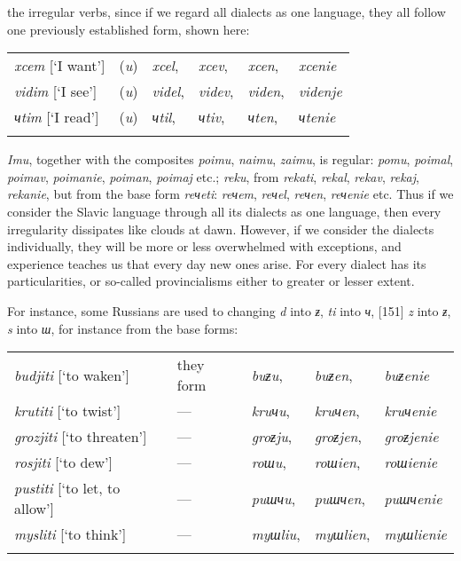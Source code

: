 the irregular verbs, since if we regard all dialects as one language, they all follow one previously established form, shown here:

\begin{longtable}{ l l l l l l }
    \lsptoprule
    \textit{xcem} [‘I want’] & (\textit{u}) & \textit{xcel}, & \textit{xcev}, & \textit{xcen}, & \textit{xcenie} \\
    \textit{vidim} [‘I see’] & (\textit{u}) & \textit{videl}, & \textit{videv}, & \textit{viden}, & \textit{videnje} \\
    \textit{чtim} [‘I read’] & (\textit{u}) & \textit{чtil}, & \textit{чtiv}, & \textit{чten}, & \textit{чtenie} \\
    \lspbottomrule
\end{longtable}

\textit{Imu}, together with the composites \textit{poimu}, \textit{naimu}, \textit{zaimu}, is regular: \textit{pomu}, \textit{poimal}, \textit{poimav}, \textit{poimanie}, \textit{poiman}, \textit{poimaj} etc.; \textit{reku}, from \textit{rekati}, \textit{rekal}, \textit{rekav}, \textit{rekaj}, \textit{rekanie}, but from the base form \textit{reчeti}: \textit{reчem}, \textit{reчel}, \textit{reчen}, \textit{reчenie} etc. Thus if we consider the Slavic language through all its dialects as one language, then every irregularity dissipates like clouds at dawn. However, if we consider the dialects individually, they will be more or less overwhelmed with exceptions, and experience teaches us that every day new ones arise. For every dialect has its particularities, or so-called provincialisms either to greater or lesser extent.

For instance, some Russians are used to changing \textit{d} into \textit{ƶ}, \textit{ti} into \textit{ч}, [151] \textit{z} into \textit{ƶ}, \textit{s} into \textit{ш}, for instance from the base forms:

\newpage

\begin{longtable}{ l l l l l }
    \lsptoprule
    \textit{budjiti} [‘to waken’] & they form & \textit{buƶu}, & \textit{buƶen}, & \textit{buƶenie} \\
    \textit{krutiti} [‘to twist’] & — & \textit{kruчu}, & \textit{kruчen}, & \textit{kruчenie} \\
    \textit{grozjiti} [‘to threaten’] & — & \textit{groƶju}, & \textit{groƶjen},& \textit{groƶjenie} \\
    \textit{rosjiti} [‘to dew’] & — & \textit{roшu}, & \textit{roшien}, & \textit{roшienie} \\
    \textit{pustiti} [‘to let, to allow’]	& — & \textit{puшчu}, & \textit{puшчen}, & \textit{puшчenie} \\
    \textit{mysliti} [‘to think’] & — & \textit{myшliu}, & \textit{myшlien}, & \textit{myшlienie} \\
    \lspbottomrule
\end{longtable}


